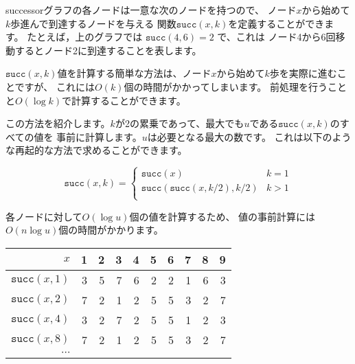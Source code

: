 successorグラフの各ノードは一意な次のノードを持つので、
ノード$x$から始めて$k$歩進んで到達するノードを与える
関数$\texttt{succ}(x,k)$を定義することができます。
たとえば，上のグラフでは $\texttt{succ}(4,6)=2$ で、これは
ノード4から6回移動するとノード2に到達することを表します。
\begin{center}
\end{center}

$\texttt{succ}(x,k)$値を計算する簡単な方法は、ノード$x$から始めて$k$歩を実際に進むことですが、
これには$O(k)$個の時間がかかってしまいます。
前処理を行うことと$O(\log k)$で計算することができます。

この方法を紹介します。$k$が2の累乗であって、最大でも$u$である$\texttt{succ}(x,k)$のすべての値を
事前に計算します。$u$は必要となる最大の数です。
これは以下のような再起的な方法で求めることができます。　

\begin{equation*}
    \texttt{succ}(x,k) = \begin{cases}
               \texttt{succ}(x)              & k = 1\\
               \texttt{succ}(\texttt{succ}(x,k/2),k/2)   & k > 1\\
           \end{cases}
\end{equation*}

各ノードに対して$O(\log u)$個の値を計算するため、
値の事前計算には$O(n \log u)$個の時間がかかります。

\begin{center}
\begin{tabular}{r|rrrrrrrrr}
$x$ & 1 & 2 & 3 & 4 & 5 & 6 & 7 & 8 & 9 \\
\hline
$\texttt{succ}(x,1)$ & 3 & 5 & 7 & 6 & 2 & 2 & 1 & 6 & 3 \\
$\texttt{succ}(x,2)$ & 7 & 2 & 1 & 2 & 5 & 5 & 3 & 2 & 7 \\
$\texttt{succ}(x,4)$ & 3 & 2 & 7 & 2 & 5 & 5 & 1 & 2 & 3 \\
$\texttt{succ}(x,8)$ & 7 & 2 & 1 & 2 & 5 & 5 & 3 & 2 & 7 \\
$\cdots$ \\
\end{tabular}
\end{center}

